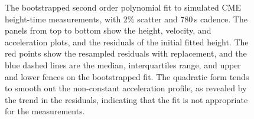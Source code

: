 \documentclass[referee]{aa}
\begin{document}
\begin{figure}[t]
\centering
{}
\caption{The bootstrapped second order polynomial fit to simulated CME height-time measurements, with 2\% scatter and 780\,s cadence. The panels from top to bottom show the height, velocity, and acceleration plots, and the residuals of the initial fitted height. The red points show the resampled residuals with replacement, and the blue dashed lines are the median, interquartiles range, and upper and lower fences on the bootstrapped fit. The quadratic form tends to smooth out the non-constant acceleration profile, as revealed by the trend in the residuals, indicating that the fit is not appropriate for the measurements.}
\label{fig_quadratic}
\end{figure}
\end{document}
